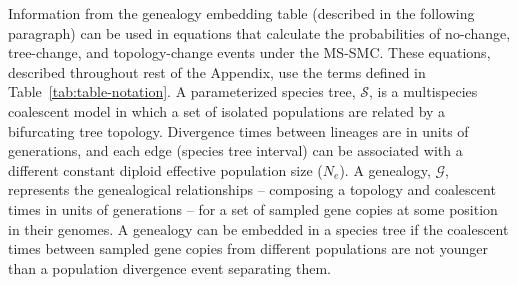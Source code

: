 \documentclass[11pt]{article}
\begin{document}
Information from the genealogy embedding table (described in the following paragraph) can be used 
in equations that 
calculate the 
probabilities of no-change, tree-change, and topology-change events under the 
MS-SMC. These equations, described throughout rest of the Appendix, use the terms defined in 
Table~\ref{tab:table-notation}. 
A parameterized species tree, $\mathcal{S}$, is a multispecies coalescent 
model in which a set of isolated populations are related by a bifurcating
tree topology. Divergence times between lineages are in units of generations, 
and each edge (species tree interval) can be associated with a different constant 
diploid effective population size ($N_e$). 
A genealogy, $\mathcal{G}$, represents the genealogical relationships -- composing
a topology and coalescent times in units of generations -- for a set 
of sampled gene copies at some position in their genomes. A genealogy can be 
embedded in a species tree if the coalescent times between sampled gene copies
from different populations are not younger than a population divergence
event separating them.






\end{document}
